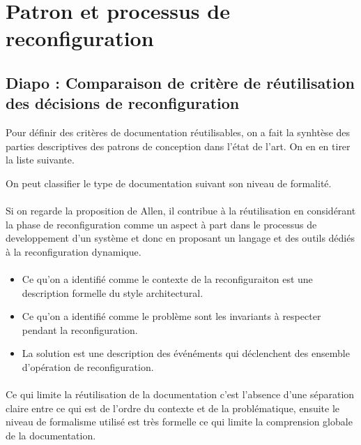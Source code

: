\section{Patron et processus de reconfiguration}

\subsection{Diapo : Comparaison de critère de réutilisation des
décisions de reconfiguration}

Pour définir des critères de documentation réutilisables, on a fait la
synhtèse des parties descriptives des patrons de conception dans
l'état de l'art. On en en tirer la liste suivante. 

On peut classifier le type de documentation suivant son niveau de
formalité. 

\paragraph{}
Si on regarde la proposition de Allen, il contribue à la 
réutilisation en considérant la phase de reconfiguration comme un
aspect à part dans le processus de developpement d'un système et donc
en proposant un langage et des outils dédiés à la reconfiguration
dynamique.

\paragraph{}
\begin{itemize} 
\item Ce qu'on a identifié comme le contexte de la reconfiguraiton est une
description formelle du style architectural. 
\item Ce qu'on a identifié
comme le problème sont les invariants à respecter pendant la
reconfiguration. 
\item La solution est une description des événéments qui déclenchent des
ensemble d'opération de reconfiguration. 
\end{itemize}

\paragraph{}
Ce qui limite la réutilisation de la documentation c'est l'absence
d'une séparation claire entre ce qui est de l'ordre du contexte et de
la problématique, ensuite le niveau de formalisme utilisé est très
formelle ce qui limite la comprension globale de la documentation. 
%

